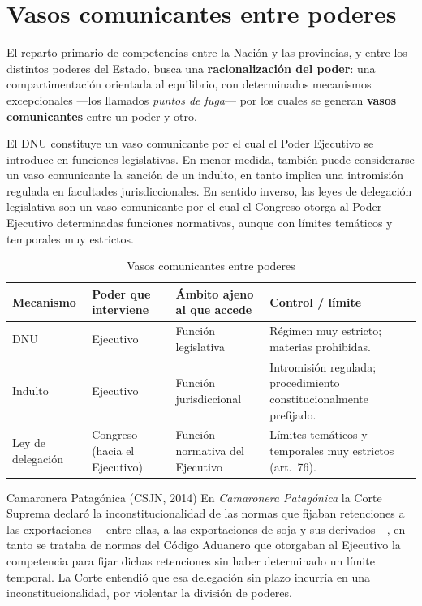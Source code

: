 \documentclass[12pt,oneside]{book}
\begin{document}
\section{Vasos comunicantes entre poderes}

El reparto primario de competencias entre la Nación y las provincias, y entre los distintos poderes del Estado, busca una \textbf{racionalización del poder}: una compartimentación orientada al equilibrio, con determinados mecanismos excepcionales —los llamados \emph{puntos de fuga}— por los cuales se generan \textbf{vasos comunicantes} entre un poder y otro.

El DNU constituye un vaso comunicante por el cual el Poder Ejecutivo se introduce en funciones legislativas. En menor medida, también puede considerarse un vaso comunicante la sanción de un indulto, en tanto implica una intromisión regulada en facultades jurisdiccionales. En sentido inverso, las leyes de delegación legislativa son un vaso comunicante por el cual el Congreso otorga al Poder Ejecutivo determinadas funciones normativas, aunque con límites temáticos y temporales muy estrictos.

\begin{table}[H]
\centering
\caption{Vasos comunicantes entre poderes}
\begin{tabularx}{\textwidth}{>{\raggedright\arraybackslash}p{} >{\raggedright\arraybackslash}p{} >{\raggedright\arraybackslash}p{} X}
\toprule
\textbf{Mecanismo} & \textbf{Poder que interviene} & \textbf{Ámbito ajeno al que accede} & \textbf{Control / límite} \\
\midrule
DNU & Ejecutivo & Función legislativa & Régimen muy estricto; materias prohibidas. \\
Indulto & Ejecutivo & Función jurisdiccional & Intromisión regulada; procedimiento constitucionalmente prefijado. \\
Ley de delegación & Congreso (hacia el Ejecutivo) & Función normativa del Ejecutivo & Límites temáticos y temporales muy estrictos (art.\ 76). \\
\bottomrule
\end{tabularx}
\end{table}

\begin{example}{Camaronera Patagónica (CSJN, 2014)}
En \emph{Camaronera Patagónica} la Corte Suprema declaró la inconstitucionalidad de las normas que fijaban retenciones a las exportaciones —entre ellas, a las exportaciones de soja y sus derivados—, en tanto se trataba de normas del Código Aduanero que otorgaban al Ejecutivo la competencia para fijar dichas retenciones sin haber determinado un límite temporal. La Corte entendió que esa delegación sin plazo incurría en una inconstitucionalidad, por violentar la división de poderes.
\end{example}
\end{document}
